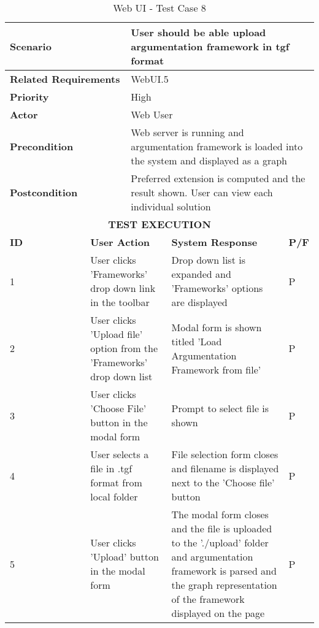 \begin{longtable}[c]{p{}|p{}|p{}|p{}|p{}}
	\caption{Web UI - Test Case 8}
	\label{table:testcase8} \\
	\hline
	\multicolumn{2}{p{0.3\textwidth}}{\textbf{Scenario}} & \multicolumn{3}{p{0.7\textwidth}}{User should be able upload argumentation framework in tgf format} \\ 
	\hline
	\endfirsthead
	\endhead
	\multicolumn{2}{p{0.4\textwidth}}{\textbf{Related Requirements}} & \multicolumn{3}{p{0.6\textwidth}}{WebUI.5} \\ 
	\hline
	\multicolumn{2}{p{0.4\textwidth}}{\textbf{Priority}} & \multicolumn{3}{p{0.6\textwidth}}{High} \\ 
	\hline
	\multicolumn{2}{p{0.3\textwidth}}{\textbf{Actor}} & \multicolumn{3}{p{0.7\textwidth}}{Web User} \\ 
	\hline
	\multicolumn{2}{p{0.3\textwidth}}{\textbf{Precondition}} & \multicolumn{3}{p{0.7\textwidth}}{Web server is running and argumentation framework is loaded into the system and displayed as a graph} \\ 
	\hline
	\multicolumn{2}{p{0.3\textwidth}}{\textbf{Postcondition}} & \multicolumn{3}{p{0.7\textwidth}}{Preferred extension is computed and the result shown. User can view each individual solution} \\ 
	\hline
	\multicolumn{5}{c}{\cellcolor{grey}\textbf{TEST EXECUTION}} \\ 
	\hline
	\textbf{ID} & \multicolumn{2}{|p{0.4\textwidth}|}{\textbf{User Action}} & \textbf{System Response} & \textbf{P/F} \\ 
	\hline
	1 & \multicolumn{2}{|p{0.4\textwidth}|}{User clicks 'Frameworks' drop down link in the toolbar} & Drop down list is expanded and 'Frameworks' options are displayed & P \\ 
	\hline
	2 & \multicolumn{2}{|p{0.4\textwidth}|}{User clicks 'Upload file' option from the 'Frameworks' drop down list } & Modal form is shown titled 'Load Argumentation Framework from file' & P \\ 
	\hline
	3 & \multicolumn{2}{|p{0.4\textwidth}|}{User clicks 'Choose File' button in the modal form } & Prompt to select file is shown & P \\ 
	\hline
	4 & \multicolumn{2}{|p{0.4\textwidth}|}{User selects a file in .tgf format from local folder } & File selection form closes and filename is displayed next to the 'Choose file' button & P \\ 
	\hline
	5 & \multicolumn{2}{|p{0.4\textwidth}|}{User clicks 'Upload' button in the modal form } & The modal form closes and the file is uploaded to the './upload' folder and argumentation framework is parsed and the graph representation of the framework displayed on the page & P \\ 
	\hline
\end{longtable}